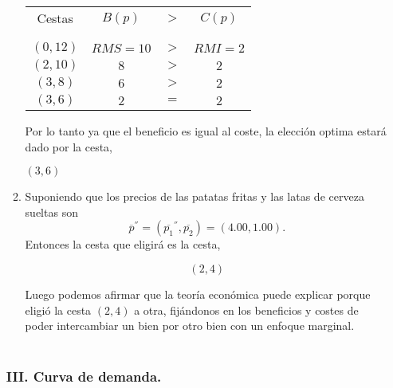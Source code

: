 \begin{enumerate}
\begin{enumerate}[\bfseries (4.1)]
			\begin{center}
			    \begin{tabular}{c|ccc}
				Cestas&$B(p)$&$>$&$C(p)$\\\\
				\hline\\
				$(0,12)$&$RMS=10$ & $>$ & $RMI=2$\\
				$(2,10)$&$8$ & $>$ & $2$\\
				$(3,8)$ & $6$ & $>$ & $2$ \\
				$(3,6)$ & $2$ & $=$ & $2$ \\
			    \end{tabular}
			    \vspace{1cm}
		    \end{center}

		    Por lo tanto ya que el beneficio es igual al coste, la elección optima  estará dado por la cesta,\\
		    \begin{tcolorbox}[colframe=white]
			\begin{center}
			    $(3,6)$
			\end{center}
		    \end{tcolorbox}
		    \vspace{1cm}


		\item Suponiendo que los precios de las patatas fritas y las latas de cerveza sueltas son $$\overline{p}^{''} = \left( \overline{p_1}^{''},\overline{p_2}\right) = (4.00,1.00).$$ 
		    Entonces la cesta que eligirá es la cesta, 
		    \begin{tcolorbox}[colframe=white]
			$$(2,4)$$
		    \end{tcolorbox}
		    Luego podemos afirmar que la teoría económica puede explicar porque eligió la cesta $(2,4)$ a otra, fijándonos en los beneficios y costes de poder intercambiar un bien por otro bien  con un enfoque marginal.\\\\ 
		    


	\end{enumerate}

\subsubsection*{\center III. Curva de demanda.}
\vspace{.5cm}


\end{enumerate}
